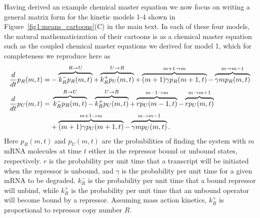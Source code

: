 Having derived an example chemical master equation we now focus on writing a
general matrix form for the kinetic models 1-4 shown in
Figure~\ref{fig1:means_cartoons}(C) in the main text. In each of these four
models, the natural mathematicization of their cartoons is as a chemical master
equation such as the coupled chemical master equations we derived for model 1,
which for completeness we reproduce here as
\begin{align}
\begin{split}
\frac{d {}}{d t}p_R(m,t) =& 
- \overbrace{k_R^- p_R(m,t)}^{R \rightarrow U}
+ \overbrace{k_R^+ p_U(m,t)}^{U \rightarrow R}
+ \overbrace{(m+1)\gamma p_R(m+1,t)}^{m + 1 \rightarrow m}
- \overbrace{\gamma mp_R(m,t)}^{m \rightarrow m - 1}
\\
\frac{d {}}{d t}p_U(m,t) =&\; 
\overbrace{k_R^- p_R(m,t)}^{R \rightarrow U}
- \overbrace{k_R^+ p_U(m,t)}^{U \rightarrow R}
+ \overbrace{rp_U(m-1,t)}^{m-1 \rightarrow m}
- \overbrace{rp_U(m,t)}^{m \rightarrow m + 1}
\\
&+ \overbrace{(m+1)\gamma p_U(m+1,t)}^{m + 1 \rightarrow m}
- \overbrace{\gamma mp_U(m,t)}^{m \rightarrow m - 1}.
\label{eq:poisson_promoter_cme_appdx}
\end{split}
\end{align}
Here $p_R(m,t)$ and $p_U(m,t)$ are the probabilities of finding the system with
$m$ mRNA molecules at time $t$ either in the repressor bound or unbound states,
respectively. $r$ is the probability per unit time that a transcript will be
initiated when the repressor is unbound, and $\gamma$ is the probability per
unit time for a given mRNA to be degraded. $k_R^-$ is the probability per unit
time that a bound repressor will unbind, while $k_R^+$ is the probability per
unit time that an unbound operator will become bound by a repressor. Assuming
mass action kinetics, $k_R^+$ is proportional to repressor copy number $R$.

